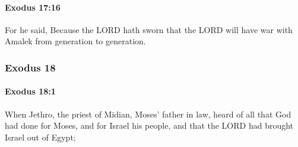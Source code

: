 		\paragraph{Exodus 17:16} %
			\label{EXODUS-17-16}

			For he said, Because the LORD hath sworn that the LORD will have war with Amalek from generation to generation.

	\subsubsection{Exodus 18} %
		\label{EXODUS-18}

		\paragraph{Exodus 18:1} %
			\label{EXODUS-18-1}

			When Jethro, the priest of Midian, Moses' father in law, heard of all that God had done for Moses, and for Israel his people, and that the LORD had brought Israel out of Egypt;

